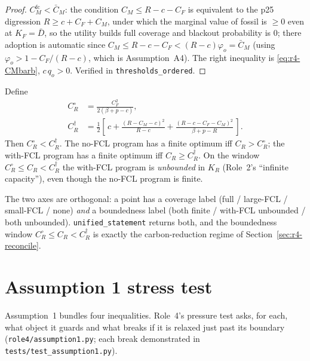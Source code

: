 \begin{proof}
$C_M^{\mathrm{fc}}<\bar C_M$: the condition $C_M\le R-c-C_F$ is equivalent to the p25
digression $R\ge c+C_F+C_M$, under which the marginal value of fossil is $\ge 0$ even at
$K_F=\bar D$, so the utility builds full coverage and blackout probability is $0$;
there adoption is automatic since $C_M\le R-c-C_F<(R-c)\varphi_o=\bar C_M$ (using
$\varphi_o>1-C_F/(R-c)$, which is Assumption~A4). The right inequality is
\eqref{eq:r4-CMbarb}, $c\,q_o>0$. Verified in \texttt{thresholds\_ordered}.
\end{proof}

\begin{proposition}
\label{prop:r4-bounded}
Define
\begin{align}
C_R^\circ &= \frac{C_F^2}{2(\beta+p-c)}, \\
C_R^\dagger &= \tfrac12\!\left[\, c
   + \frac{(R-C_M-c)^2}{R-c}
   + \frac{(R-c-C_F-C_M)^2}{\beta+p-R}\,\right].
\end{align}
Then $C_R^\circ<C_R^\dagger$. The no-FCL program has a finite optimum iff
$C_R>C_R^\circ$; the with-FCL program has a finite optimum iff $C_R\ge C_R^\dagger$.
On the window $C_R^\circ\le C_R<C_R^\dagger$ the with-FCL program is \emph{unbounded}
in $K_R$ (Role~2's ``infinite capacity''), even though the no-FCL program is finite.
\end{proposition}

\begin{remark}
The two axes are orthogonal: a point has a coverage label (full / large-FCL /
small-FCL / none) \emph{and} a boundedness label (both finite / with-FCL unbounded /
both unbounded). \texttt{unified\_statement} returns both, and the boundedness window
$C_R^\circ\le C_R<C_R^\dagger$ is exactly the carbon-reduction regime of
Section~\ref{sec:r4-reconcile}.
\end{remark}

\section{Assumption 1 stress test}
\label{sec:r4-assumption1}

Assumption~1 bundles four inequalities. Role~4's pressure test asks, for each, what
object it guards and what breaks if it is relaxed just past its boundary
(\texttt{role4/assumption1.py}; each break demonstrated in
\texttt{tests/test\_assumption1.py}).

